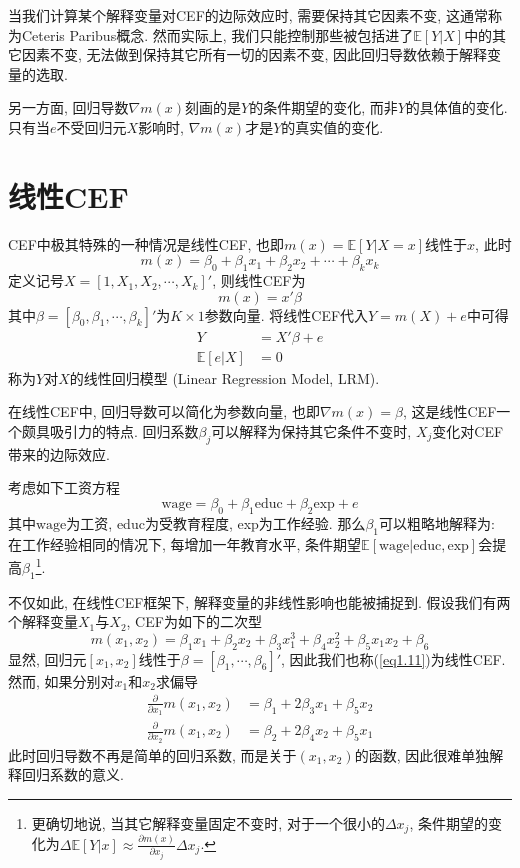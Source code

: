 \documentclass[cn, 12pt, math=mtpro2, bibstyle=apa, blue, twocol]{elegantbook}
\newcommand{\E}{\mathbb{E}}
\begin{document}
当我们计算某个解释变量对CEF的边际效应时, 需要保持其它因素不变, 这通常称为Ceteris Paribus概念. 然而实际上, 我们只能控制那些被包括进了$\E[Y|X]$中的其它因素不变, 无法做到保持其它所有一切的因素不变, 因此回归导数依赖于解释变量的选取.

另一方面, 回归导数$\nabla m(x)$刻画的是$Y$的条件期望的变化, 而非$Y$的具体值的变化. 只有当$e$不受回归元$X$影响时, $\nabla m(x)$才是$Y$的真实值的变化.

\section{线性CEF}
CEF中极其特殊的一种情况是线性CEF, 也即$m(x)=\E[Y|X=x]$线性于$x$, 此时
$$m(x)=\beta_0+\beta_1x_1+\beta_2x_2+\cdots+\beta_{k}x_{k}$$
定义记号$X=[1,X_1,X_2,\cdots,X_{k}]'$, 则线性CEF为
\begin{equation}\label{eq1.10}
  m(x)=x'\beta
\end{equation}
其中$\beta=[\beta_0,\beta_1,\cdots,\beta_k]'$为$K\times1$参数向量. 将线性CEF代入$Y=m(X)+e$中可得
\begin{align*}
Y&=X'\beta+e \\
\E[e|X]&=0
\end{align*}
称为$Y$对$X$的线性回归模型 (Linear Regression Model, LRM).


在线性CEF中, 回归导数可以简化为参数向量, 也即$\nabla m(x)=\beta$, 这是线性CEF一个颇具吸引力的特点. 回归系数$\beta_j$可以解释为保持其它条件不变时, $X_j$变化对CEF带来的边际效应.
\begin{example}\label{eg3}
考虑如下工资方程
$$\text{wage}=\beta_0+\beta_1\text{educ}+\beta_2\text{exp}+e$$
其中$\text{wage}$为工资, educ为受教育程度, exp为工作经验. 那么$\beta_1$可以粗略地解释为: 在工作经验相同的情况下, 每增加一年教育水平, 条件期望$\E[\text{wage}|\text{educ}, \text{exp}]$会提高$\beta_1$\footnote{更确切地说, 当其它解释变量固定不变时, 对于一个很小的$\Delta x_j$, 条件期望的变化为$\displaystyle\Delta \E[Y|x]\approx\frac{\partial m(x)}{\partial x_j}\Delta x_j$.}.
\end{example}

不仅如此, 在线性CEF框架下, 解释变量的非线性影响也能被捕捉到. 假设我们有两个解释变量$X_1$与$X_2$, CEF为如下的二次型
\begin{equation}\label{eq1.11}
  m(x_1,x_2)=\beta_1x_1+\beta_2x_2+\beta_3x_1^3+\beta_4x_2^2+\beta_5x_1x_2+\beta_6
\end{equation}
显然, 回归元$[x_1,x_2]$线性于$\beta=[\beta_1,\cdots,\beta_6]'$, 因此我们也称(\ref{eq1.11})为线性CEF. 然而, 如果分别对$x_1$和$x_2$求偏导
\begin{align*}
\frac{\partial}{\partial x_1}m(x_1,x_2)&=\beta_1+2\beta_3x_1+\beta_5x_2\\
\frac{\partial}{\partial x_2}m(x_1,x_2)&=\beta_2+2\beta_4x_2+\beta_5x_1
\end{align*}
此时回归导数不再是简单的回归系数, 而是关于$(x_1,x_2)$的函数, 因此很难单独解释回归系数的意义.
\end{document}
